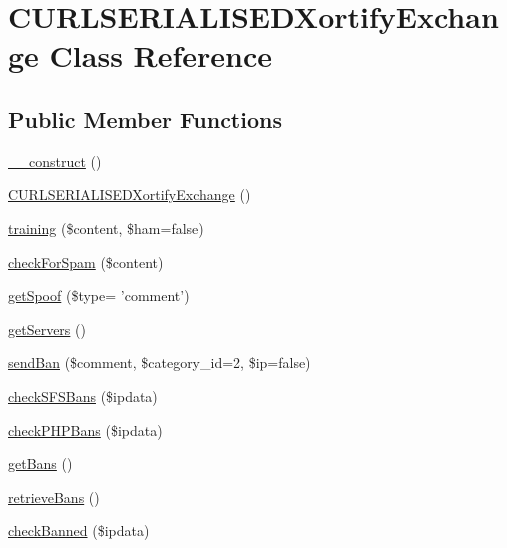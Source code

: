 \hypertarget{class_c_u_r_l_s_e_r_i_a_l_i_s_e_d_xortify_exchange}{\section{C\-U\-R\-L\-S\-E\-R\-I\-A\-L\-I\-S\-E\-D\-Xortify\-Exchange Class Reference}
\label{class_c_u_r_l_s_e_r_i_a_l_i_s_e_d_xortify_exchange}
}
\subsection*{Public Member Functions}
\begin{DoxyCompactItemize}
\item 
\hyperlink{class_c_u_r_l_s_e_r_i_a_l_i_s_e_d_xortify_exchange_a095c5d389db211932136b53f25f39685}{\-\_\-\-\_\-construct} ()
\item 
\hyperlink{class_c_u_r_l_s_e_r_i_a_l_i_s_e_d_xortify_exchange_a2d9a2fd0a191b4f2ca7f75a0ac930ffb}{C\-U\-R\-L\-S\-E\-R\-I\-A\-L\-I\-S\-E\-D\-Xortify\-Exchange} ()
\item 
\hyperlink{class_c_u_r_l_s_e_r_i_a_l_i_s_e_d_xortify_exchange_a3b3be735e633ba330c6b5d086aa508cd}{training} (\$content, \$ham=false)
\item 
\hyperlink{class_c_u_r_l_s_e_r_i_a_l_i_s_e_d_xortify_exchange_a7a4f53c3841dc7806455261af557d514}{check\-For\-Spam} (\$content)
\item 
\hyperlink{class_c_u_r_l_s_e_r_i_a_l_i_s_e_d_xortify_exchange_ae7926cba79660f77479306100f492c03}{get\-Spoof} (\$type= 'comment')
\item 
\hyperlink{class_c_u_r_l_s_e_r_i_a_l_i_s_e_d_xortify_exchange_a882f365bc81e207dc2123ef707735e82}{get\-Servers} ()
\item 
\hyperlink{class_c_u_r_l_s_e_r_i_a_l_i_s_e_d_xortify_exchange_a0293acfa4afe0cb5b2816352a35d8ca7}{send\-Ban} (\$comment, \$category\-\_\-id=2, \$ip=false)
\item 
\hyperlink{class_c_u_r_l_s_e_r_i_a_l_i_s_e_d_xortify_exchange_a985a563a84e3e5c54694fcce192bda53}{check\-S\-F\-S\-Bans} (\$ipdata)
\item 
\hyperlink{class_c_u_r_l_s_e_r_i_a_l_i_s_e_d_xortify_exchange_aeb1bf9aaee4718870adbd07333490aaf}{check\-P\-H\-P\-Bans} (\$ipdata)
\item 
\hyperlink{class_c_u_r_l_s_e_r_i_a_l_i_s_e_d_xortify_exchange_aea26db2906896833d32445a698fc4cdc}{get\-Bans} ()
\item 
\hyperlink{class_c_u_r_l_s_e_r_i_a_l_i_s_e_d_xortify_exchange_a4af29af927aae9aada97ef0c2cd08fa1}{retrieve\-Bans} ()
\item 
\hyperlink{class_c_u_r_l_s_e_r_i_a_l_i_s_e_d_xortify_exchange_ae41df0f26620b727f7f63342648f6474}{check\-Banned} (\$ipdata)
\end{DoxyCompactItemize}

